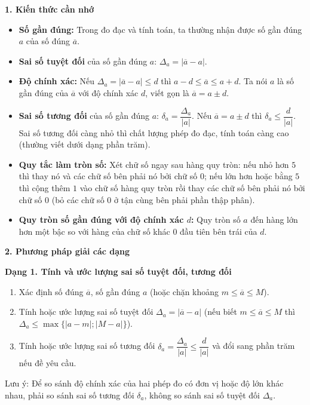 \textbf{1. Kiến thức cần nhớ}
\begin{itemize}
\item \textbf{Số gần đúng:} Trong đo đạc và tính toán, ta thường nhận được số gần đúng $a$ của số đúng $\overline{a}$.
\item \textbf{Sai số tuyệt đối} của số gần đúng $a$: $\boxed{\Delta_a = |\overline{a} - a|}$.
\item \textbf{Độ chính xác:} Nếu $\Delta_a = |\overline{a} - a| \le d$ thì $a - d \le \overline{a} \le a + d$. Ta nói $a$ là số gần đúng của $\overline{a}$ với độ chính xác $d$, viết gọn là $\boxed{\overline{a} = a \pm d}$.
\item \textbf{Sai số tương đối} của số gần đúng $a$: $\boxed{\delta_a = \dfrac{\Delta_a}{|a|}}$. Nếu $\overline{a} = a \pm d$ thì $\delta_a \le \dfrac{d}{|a|}$. Sai số tương đối càng nhỏ thì chất lượng phép đo đạc, tính toán càng cao (thường viết dưới dạng phần trăm).
\item \textbf{Quy tắc làm tròn số:} Xét chữ số ngay sau hàng quy tròn: nếu nhỏ hơn $5$ thì thay nó và các chữ số bên phải nó bởi chữ số $0$; nếu lớn hơn hoặc bằng $5$ thì cộng thêm $1$ vào chữ số hàng quy tròn rồi thay các chữ số bên phải nó bởi chữ số $0$ (bỏ các chữ số $0$ ở tận cùng bên phải phần thập phân).
\item \textbf{Quy tròn số gần đúng với độ chính xác $d$:} Quy tròn số $a$ đến hàng lớn hơn một bậc so với hàng của chữ số khác $0$ đầu tiên bên trái của $d$.
\end{itemize}

\textbf{2. Phương pháp giải các dạng}

\textbf{Dạng 1. Tính và ước lượng sai số tuyệt đối, tương đối}
\begin{enumerate}
\item Xác định số đúng $\overline{a}$, số gần đúng $a$ (hoặc chặn khoảng $m \le \overline{a} \le M$).
\item Tính hoặc ước lượng sai số tuyệt đối $\Delta_a = |\overline{a} - a|$ (nếu biết $m \le \overline{a} \le M$ thì $\Delta_a \le \max\{|a-m|; |M-a|\}$).
\item Tính hoặc ước lượng sai số tương đối $\delta_a = \dfrac{\Delta_a}{|a|} \le \dfrac{d}{|a|}$ và đổi sang phần trăm nếu đề yêu cầu.
\end{enumerate}
Lưu ý: Để so sánh độ chính xác của hai phép đo có đơn vị hoặc độ lớn khác nhau, phải so sánh sai số tương đối $\delta_a$, không so sánh sai số tuyệt đối $\Delta_a$.

